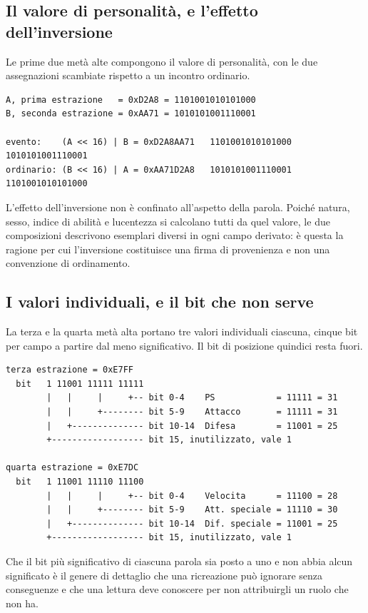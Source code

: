 \subsection*{Il valore di personalità, e l'effetto dell'inversione}

Le prime due metà alte compongono il valore di personalità, con le due assegnazioni scambiate rispetto a un incontro ordinario.

\begin{verbatim}
A, prima estrazione   = 0xD2A8 = 1101001010101000
B, seconda estrazione = 0xAA71 = 1010101001110001

evento:    (A << 16) | B = 0xD2A8AA71   1101001010101000 1010101001110001
ordinario: (B << 16) | A = 0xAA71D2A8   1010101001110001 1101001010101000
\end{verbatim}

L'effetto dell'inversione non è confinato all'aspetto della parola. Poiché natura, sesso, indice di abilità e lucentezza si calcolano tutti da quel valore, le due composizioni descrivono esemplari diversi in ogni campo derivato: è questa la ragione per cui l'inversione costituisce una firma di provenienza e non una convenzione di ordinamento.

\subsection*{I valori individuali, e il bit che non serve}

La terza e la quarta metà alta portano tre valori individuali ciascuna, cinque bit per campo a partire dal meno significativo. Il bit di posizione quindici resta fuori.

\begin{verbatim}
terza estrazione = 0xE7FF
  bit   1 11001 11111 11111
        |   |     |     +-- bit 0-4    PS            = 11111 = 31
        |   |     +-------- bit 5-9    Attacco       = 11111 = 31
        |   +-------------- bit 10-14  Difesa        = 11001 = 25
        +------------------ bit 15, inutilizzato, vale 1

quarta estrazione = 0xE7DC
  bit   1 11001 11110 11100
        |   |     |     +-- bit 0-4    Velocita      = 11100 = 28
        |   |     +-------- bit 5-9    Att. speciale = 11110 = 30
        |   +-------------- bit 10-14  Dif. speciale = 11001 = 25
        +------------------ bit 15, inutilizzato, vale 1
\end{verbatim}

Che il bit più significativo di ciascuna parola sia posto a uno e non abbia alcun significato è il genere di dettaglio che una ricreazione può ignorare senza conseguenze e che una lettura deve conoscere per non attribuirgli un ruolo che non ha.

